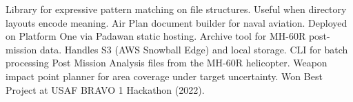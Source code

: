 \begin{enumerate}
     Library for expressive pattern matching on file
    structures. Useful when directory layouts encode meaning.
     Air Plan document builder for naval aviation.
    Deployed on Platform One via Padawan static hosting.
     Archive tool for MH-60R post-mission data.
    Handles S3 (AWS Snowball Edge) and local storage.
     CLI for batch processing Post Mission Analysis
    files from the MH-60R helicopter.
     Weapon impact point planner for area coverage
    under target uncertainty. Won Best Project at USAF BRAVO 1 Hackathon (2022).
\end{enumerate}
